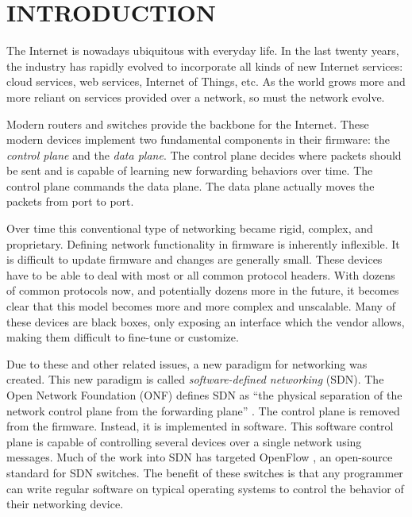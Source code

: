 \chapter{INTRODUCTION} \label{ch:intro}

%
%



The Internet is nowadays ubiquitous with everyday life. In the last twenty years,
the industry has rapidly evolved to incorporate all kinds of new Internet services:
cloud services, web services, Internet of Things, etc. As the world grows more and
more reliant on services provided over a network, so must the network evolve.

Modern routers and switches provide the backbone for the Internet.
These modern devices implement two fundamental components in their firmware: the
\emph{control plane} and the \emph{data plane}.
The control plane decides where packets should be sent and is capable of learning
new forwarding behaviors over time. The control plane commands the data plane.
The data plane actually moves the packets from port to port.

Over time this conventional type of networking became rigid, complex, and
proprietary. Defining network functionality in firmware is inherently inflexible.
It is difficult to update firmware and changes are generally small. These devices
have to be able to deal with most or all common protocol headers. With dozens of
common protocols now, and potentially dozens more in the future, it becomes clear
that this model becomes more and more complex and unscalable.
Many of these devices are black boxes, only exposing an interface which the
vendor allows, making them difficult to fine-tune or customize.

Due to these and other related issues,
a new paradigm for networking was created. This new paradigm
is called \textit{software-defined networking} (SDN). The Open Network
Foundation (ONF) defines SDN as ``the physical separation of the network control
plane from the forwarding plane'' \cite{onf_sdn_def}.
The control plane is removed from the firmware.
Instead, it is implemented in software.
This software control plane is capable of controlling several devices over a
single network using messages. Much of the work into SDN has targeted OpenFlow
\cite{openflow_spec}, an open-source standard for SDN switches. The benefit of
these switches is that any programmer can write regular software on typical operating
systems to control the behavior of their networking device.

